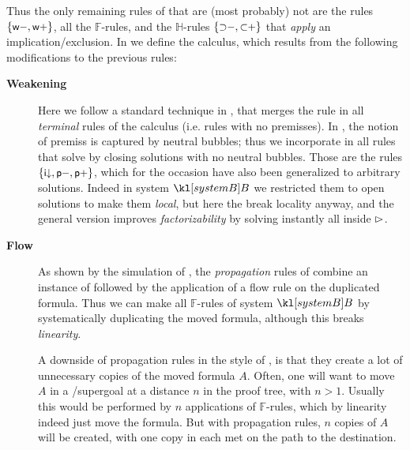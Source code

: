 Thus the only remaining rules of  that are (most probably) not
 are the  rules $\{\text{\small$\mathsf{w{-}}$},\text{\small$\mathsf{w{+}}$}\}$, all the
$\mathbb{F}$-rules, and the $\mathbb{H}$-rules $\{\text{\small$\mathsf{{\supset}{-}}$},
\text{\small$\mathsf{{\subset}{+}}$}\}$ that \emph{apply} an implication/exclusion.
In  we define the  calculus, which results
from the following modifications to the previous rules:
\begin{description}
  \item[\textbf{Weakening}]
    Here we follow a standard technique in , that merges the
     rule in all \emph{terminal} rules of the calculus (i.e. rules with
    no premisses). In , the notion of premiss is captured by
    neutral bubbles; thus we incorporate  in all rules that solve
     by closing solutions with no neutral bubbles. Those are the rules
    $\{\text{\small$\mathsf{i{\downarrow}}$},\text{\small$\mathsf{p{-}}$},\text{\small$\mathsf{p{+}}$}\}$, which for the occasion have
    also been generalized to arbitrary solutions. Indeed in system $\sysB$ we
    restricted them to open solutions to make them \emph{local}, but here the
     break locality anyway, and the general version improves
    \emph{factorizability} by solving instantly all  inside $\mathbin{\rhd}$.

  \item[\textbf{Flow}]
    As shown by the simulation of , the
    \emph{propagation} rules of  combine an instance of
    \emph{} followed by the application of a flow rule on the
    duplicated formula. Thus we can make all $\mathbb{F}$-rules of system
    $\sysB$  by systematically duplicating the moved formula, although
    this breaks \emph{linearity}.

    A downside of propagation rules in the style of , is that they
    create a lot of unnecessary copies of the moved formula $A$. Often, one will
    want to move $A$ in a /supergoal at a distance $n$ in the proof tree,
    with $n > 1$. Usually this would be performed by $n$ applications of
    $\mathbb{F}$-rules, which by linearity indeed just move the formula. But with
    propagation rules, $n$ copies of $A$ will be created, with one copy in each
     met on the path to the destination.


\end{description}

